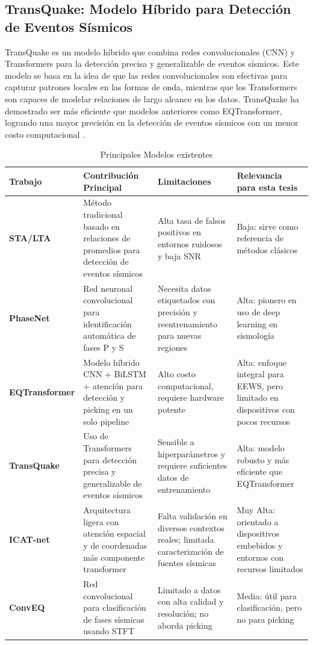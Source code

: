 \subsection{TransQuake: Modelo Híbrido para Detección de Eventos Sísmicos}
TransQuake es un modelo híbrido que combina redes convolucionales (CNN) y Transformers para la detección precisa y generalizable de eventos sísmicos. Este modelo se basa en la idea de que las redes convolucionales son efectivas para capturar patrones locales en las formas de onda, mientras que los Transformers son capaces de modelar relaciones de largo alcance en los datos. TransQuake ha demostrado ser más eficiente que modelos anteriores como EQTransformer, logrando una mayor precisión en la detección de eventos sísmicos con un menor costo computacional \cite{zhang2023ept}.

\begin{table}[htbp]
\centering
\caption{Principales Modelos existentes}
\begin{tabular}{p{3cm}p{4.2cm}p{4.2cm}p{3cm}}
\hline
\textbf{Trabajo} & \textbf{Contribución Principal} & \textbf{Limitaciones} & \textbf{Relevancia para esta tesis} \\
\hline
\textbf{STA/LTA} & Método tradicional basado en relaciones de promedios para detección de eventos sísmicos & Alta tasa de falsos positivos en entornos ruidosos y baja SNR & Baja: sirve como referencia de métodos clásicos \\
\hline
\textbf{PhaseNet} & Red neuronal convolucional para identificación automática de fases P y S & Necesita datos etiquetados con precisión y reentrenamiento para nuevas regiones & Alta: pionero en uso de deep learning en sismología \\
\hline
\textbf{EQTransformer} & Modelo híbrido CNN + BiLSTM + atención para detección y picking en un solo pipeline & Alto costo computacional, requiere hardware potente & Alta: enfoque integral para EEWS, pero limitado en dispositivos con pocos recursos \\
\hline
\textbf{TransQuake} & Uso de Transformers para detección precisa y generalizable de eventos sísmicos & Sensible a hiperparámetros y requiere suficientes datos de entrenamiento & Alta: modelo robusto y más eficiente que EQTransformer \\
\hline
\textbf{ICAT-net} & Arquitectura ligera con atención espacial y de coordenadas más componente transformer & Falta validación en diversos contextos reales; limitada caracterización de fuentes sísmicas & Muy Alta: orientado a dispositivos embebidos y entornos con recursos limitados \\
\hline
\textbf{ConvEQ} & Red convolucional para clasificación de fases sísmicas usando STFT & Limitado a datos con alta calidad y resolución; no aborda picking & Media: útil para clasificación, pero no para picking \\
\end{tabular}
\label{tab:trabajos_relacionados}
\end{table}


